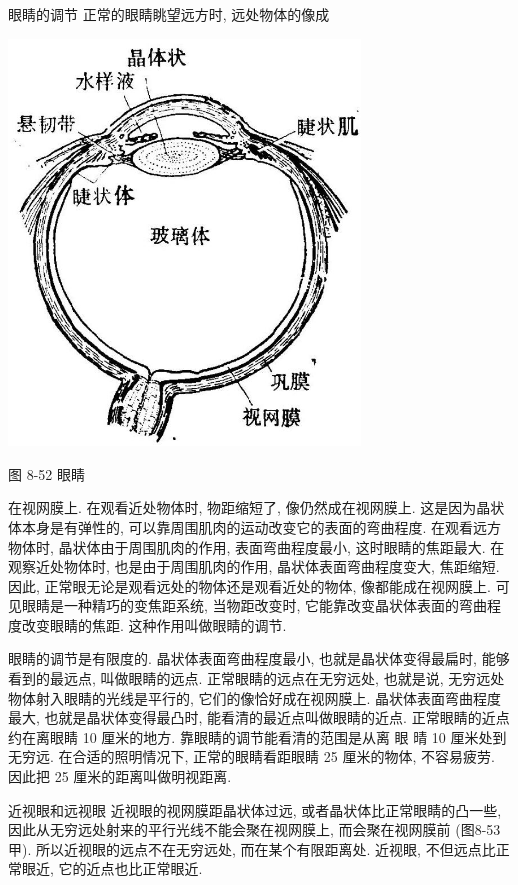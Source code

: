 \documentclass[10pt]{article}
\begin{document}
眼睛的调节 正常的眼睛眺望远方时, 远处物体的像成

\begin{center}
\includegraphics[max width=0.7\textwidth]{images/01913056-1f15-74d8-9184-9aab52c9d66b_286_486765.jpg}
\end{center}

图 8-52 眼睛

在视网膜上. 在观看近处物体时, 物距缩短了, 像仍然成在视网膜上. 这是因为晶状体本身是有弹性的, 可以靠周围肌肉的运动改变它的表面的弯曲程度. 在观看远方物体时, 晶状体由于周围肌肉的作用, 表面弯曲程度最小, 这时眼睛的焦距最大. 在观察近处物体时, 也是由于周围肌肉的作用, 晶状体表面弯曲程度变大, 焦距缩短. 因此, 正常眼无论是观看远处的物体还是观看近处的物体, 像都能成在视网膜上. 可见眼睛是一种精巧的变焦距系统, 当物距改变时, 它能靠改变晶状体表面的弯曲程度改变眼睛的焦距. 这种作用叫做眼睛的调节.

眼睛的调节是有限度的. 晶状体表面弯曲程度最小, 也就是晶状体变得最扁时, 能够看到的最远点, 叫做眼睛的远点. 正常眼睛的远点在无穷远处, 也就是说, 无穷远处物体射入眼睛的光线是平行的, 它们的像恰好成在视网膜上. 晶状体表面弯曲程度最大, 也就是晶状体变得最凸时, 能看清的最近点叫做眼睛的近点. 正常眼睛的近点约在离眼睛 10 厘米的地方. 靠眼睛的调节能看清的范围是从离 眼 晴 10 厘米处到无穷远. 在合适的照明情况下, 正常的眼睛看距眼睛 25 厘米的物体, 不容易疲劳. 因此把 25 厘米的距离叫做明视距离.

近视眼和远视眼 近视眼的视网膜距晶状体过远, 或者晶状体比正常眼睛的凸一些, 因此从无穷远处射来的平行光线不能会聚在视网膜上, 而会聚在视网膜前 (图8-53 甲). 所以近视眼的远点不在无穷远处, 而在某个有限距离处. 近视眼, 不但远点比正常眼近, 它的近点也比正常眼近.
\end{document}
